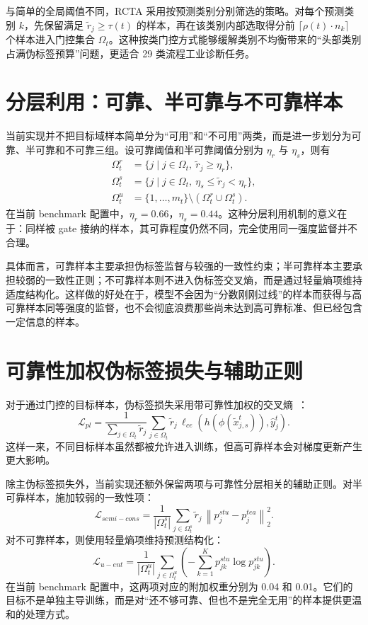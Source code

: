 与简单的全局阈值不同，RCTA 采用按预测类别分别筛选的策略。对每个预测类别 $k$，先保留满足 $\tilde{r}_j\ge \tau(t)$ 的样本，再在该类别内部选取得分前 $\lceil \rho(t)\cdot n_k\rceil$ 个样本进入门控集合 $\Omega_t$。这种按类门控方式能够缓解类别不均衡带来的“头部类别占满伪标签预算”问题，更适合 29 类流程工业诊断任务。

\section{分层利用：可靠、半可靠与不可靠样本}
当前实现并不把目标域样本简单分为“可用”和“不可用”两类，而是进一步划分为可靠、半可靠和不可靠三组。设可靠阈值和半可靠阈值分别为 $\eta_r$ 与 $\eta_s$，则有
\begin{align}
\Omega_t^{r} &= \{j\mid j\in\Omega_t,\ \tilde{r}_j\ge \eta_r\},\\
\Omega_t^{s} &= \{j\mid j\in\Omega_t,\ \eta_s\le \tilde{r}_j < \eta_r\},\\
\Omega_t^{u} &= \{1,\ldots,m_t\}\setminus(\Omega_t^{r}\cup\Omega_t^{s}).
\end{align}
在当前 benchmark 配置中，$\eta_r=0.66$，$\eta_s=0.44$。这种分层利用机制的意义在于：同样被 gate 接纳的样本，其可靠程度仍然不同，完全使用同一强度监督并不合理。

具体而言，可靠样本主要承担伪标签监督与较强的一致性约束；半可靠样本主要承担较弱的一致性正则；不可靠样本则不进入伪标签交叉熵，而是通过轻量熵项维持适度结构化。这样做的好处在于，模型不会因为“分数刚刚过线”的样本而获得与高可靠样本同等强度的监督，也不会彻底浪费那些尚未达到高可靠标准、但已经包含一定信息的样本。

\section{可靠性加权伪标签损失与辅助正则}
对于通过门控的目标样本，伪标签损失采用带可靠性加权的交叉熵~\cite{lee2013pseudolabel}：
\begin{equation}
\mathcal{L}_{pl}=
\frac{1}{\sum_{j\in\Omega_t}\tilde{r}_j}
\sum_{j\in\Omega_t}
\tilde{r}_j\,
\ell_{ce}\!\left(h(\phi(\tilde{x}_{j,s}^{t})),\hat{y}_j^t\right).
\end{equation}
这样一来，不同目标样本虽然都被允许进入训练，但高可靠样本会对梯度更新产生更大影响。

除主伪标签损失外，当前实现还额外保留两项与可靠性分层相关的辅助正则。对半可靠样本，施加较弱的一致性项：
\begin{equation}
\mathcal{L}_{semi-cons}=
\frac{1}{|\Omega_t^{s}|}\sum_{j\in\Omega_t^{s}}
\tilde{r}_j\,
\left\|p_j^{stu}-p_j^{tea}\right\|_2^2.
\end{equation}
对不可靠样本，则使用轻量熵项维持预测结构化：
\begin{equation}
\mathcal{L}_{u-ent}=
\frac{1}{|\Omega_t^{u}|}\sum_{j\in\Omega_t^{u}}
\left(
-\sum_{k=1}^{K}p_{jk}^{stu}\log p_{jk}^{stu}
\right).
\end{equation}
在当前 benchmark 配置中，这两项对应的附加权重分别为 0.04 和 0.01。它们的目标不是单独主导训练，而是对“还不够可靠、但也不是完全无用”的样本提供更温和的处理方式。


